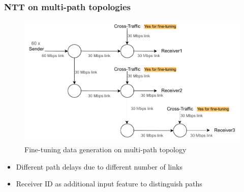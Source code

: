 \documentclass{beamer}
\begin{document}
{}

\begin{frame}
\frametitle{NTT on multi-path topologies}


\begin{figure}[h]
  \begin{center}
    \includegraphics[scale=0.58]{figures/complex_topo.pdf}
    \caption{Fine-tuning data generation on multi-path topology}
    \label{fig:topo_ft_big}
  \end{center}
\end{figure}

\pause 
\vspace{-0.6cm}
\begin{itemize}
    \item<1-> Different path delays due to different number of links 
    \item<1-> Receiver ID as additional input feature to distinguish paths
\end{itemize}

\end{frame}
\end{document}
